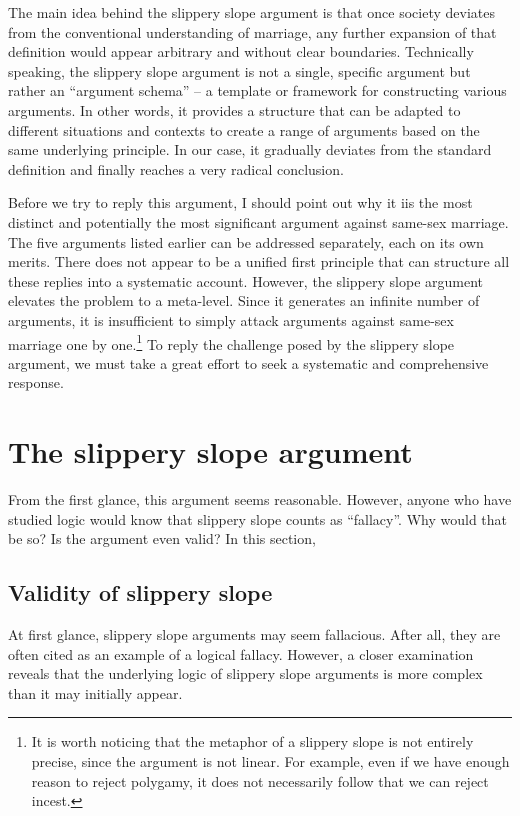 \documentclass{article}
\begin{document}
The main idea behind the slippery slope argument is that once society deviates from the conventional understanding of marriage, any further expansion of that definition would appear arbitrary and without clear boundaries. Technically speaking, the slippery slope argument is not a single, specific argument but rather an ``argument schema'' -- a template or framework for constructing various arguments. In other words, it provides a structure that can be adapted to different situations and contexts to create a range of arguments based on the same underlying principle. In our case, it gradually deviates from the standard definition and finally reaches a very radical conclusion.

Before we try to reply this argument, I should point out why it iis the most distinct and potentially the most significant argument against same-sex marriage. The five arguments listed earlier can be addressed separately, each on its own merits. There does not appear to be a unified first principle that can structure all these replies into a systematic account. However, the slippery slope argument elevates the problem to a meta-level. Since it generates an infinite number of arguments, it is insufficient to simply attack arguments against same-sex marriage one by one.\footnote{It is worth noticing that the metaphor of a slippery slope is not entirely precise, since the argument is not linear. For example, even if we have enough reason to reject polygamy, it does not necessarily follow that we can reject incest.} To reply the challenge posed by the slippery slope argument, we must take a great effort to seek a systematic and comprehensive response.

\section{The slippery slope argument}

From the first glance, this argument seems reasonable. However, anyone who have studied logic would know that slippery slope counts as ``fallacy''. Why would that be so? Is the argument even valid? In this section, 

\subsection{Validity of slippery slope}

At first glance, slippery slope arguments may seem fallacious. After all, they are often cited as an example of a logical fallacy. However, a closer examination reveals that the underlying logic of slippery slope arguments is more complex than it may initially appear.
\end{document}
